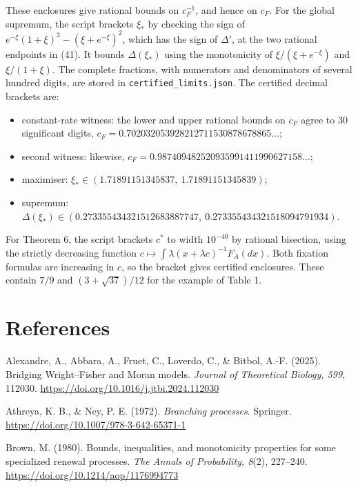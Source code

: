 \documentclass[
  british,
  11pt,
  a4paper,
]{article}
\providecommand{\tightlist}{%
  \setlength{\itemsep}{0pt}\setlength{\parskip}{0pt}}
\begin{document}
These enclosures give rational bounds on \(c_F^{-1}\), and hence on
\(c_F\). For the global supremum, the script brackets \(\xi_*\) by
checking the sign of \(e^{-\xi}(1+\xi)^3-(\xi+e^{-\xi})^2\), which has
the sign of \(\Delta'\), at the two rational endpoints in (41). It
bounds \(\Delta(\xi_*)\) using the monotonicity of
\(\xi/(\xi+e^{-\xi})\) and \(\xi/(1+\xi)\). The complete fractions, with
numerators and denominators of several hundred digits, are stored in
\texttt{certified\_limits.json}. The certified decimal brackets are:

\begin{itemize}
\tightlist
\item
  constant-rate witness: the lower and upper rational bounds on \(c_F\)
  agree to 30 significant digits,
  \(c_F=0.702032053928212711530878678865\ldots\);
\item
  second witness: likewise,
  \(c_F=0.987409482520935991411990627158\ldots\);
\item
  maximiser: \(\xi_*\in(1.71891151345837,\ 1.71891151345839)\);
\item
  supremum:
  \(\Delta(\xi_*)\in(0.273355434321512683887747,\ 0.273355434321518094791934)\).
\end{itemize}

For Theorem 6, the script brackets \(c^\ast\) to width \(10^{-40}\) by
rational bisection, using the strictly decreasing function
\(c\mapsto\int\lambda(x+\lambda c)^{-1}F_A(dx)\). Both fixation formulas
are increasing in \(c\), so the bracket gives certified enclosures.
These contain \(7/9\) and \((3+\sqrt{37})/12\) for the example of Table
1.

\section{References}\label{references}

Alexandre, A., Abbara, A., Fruet, C., Loverdo, C., \& Bitbol, A.-F.
(2025). Bridging Wright--Fisher and Moran models. \emph{Journal of
Theoretical Biology, 599}, 112030.
\url{https://doi.org/10.1016/j.jtbi.2024.112030}

Athreya, K. B., \& Ney, P. E. (1972). \emph{Branching processes}.
Springer. \url{https://doi.org/10.1007/978-3-642-65371-1}

Brown, M. (1980). Bounds, inequalities, and monotonicity properties for
some specialized renewal processes. \emph{The Annals of Probability,
8}(2), 227--240. \url{https://doi.org/10.1214/aop/1176994773}
\end{document}
